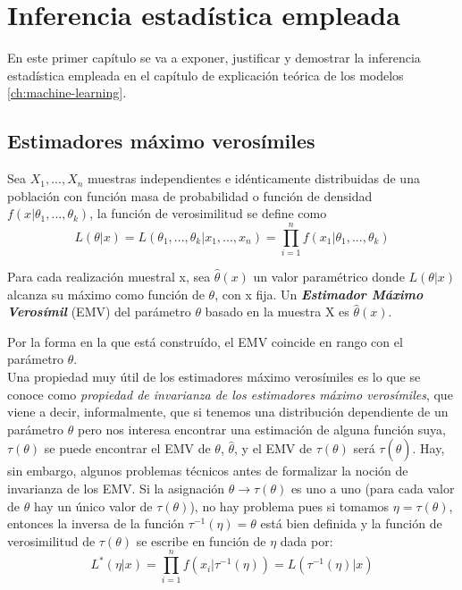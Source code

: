 
\chapter{Inferencia estadística empleada}
En este primer capítulo se va a exponer, justificar y demostrar la inferencia estadística empleada en el capítulo de explicación teórica de los modelos \autoref{ch:machine-learning}.\\
\section{Estimadores máximo verosímiles}\label{st:emv}
Sea $X_{1},...,X_{n}$ muestras independientes e idénticamente distribuidas de una población con función masa de probabilidad o función de densidad $f(x \vert \theta_{1},...,\theta_{k})$, la función de verosimilitud se define como
\[ L(\theta \vert x)=L(\theta_{1},...,\theta_{k} \vert x_{1},...,x_{n})=\prod_{i=1}^{n} f(x_{1} \vert \theta_{1},...,\theta_{k}) \]
\begin{definicion}
Para cada realización muestral x, sea $\hat{\theta}(x)$ un valor paramétrico donde $L(\theta \vert x)$ alcanza su máximo como función de $\theta$, con x fija. Un \textbf{\textit{Estimador Máximo Verosímil}} (EMV) del parámetro $\theta$ basado en la muestra X es $\hat{\theta}(x)$. \cite{garthwaite2002statistical} \end{definicion}
Por la forma en la que está construído, el EMV coincide en rango con el parámetro $\theta$.\\
Una propiedad muy útil de los estimadores máximo verosímiles es lo que se conoce como \textit{propiedad de invarianza de los estimadores máximo verosímiles}, que viene a decir, informalmente, que si tenemos una distribución dependiente de un parámetro $\theta$ pero nos interesa encontrar una estimación de alguna función suya, $\tau(\theta)$ se puede encontrar el EMV de $\theta$, $\hat{\theta}$, y el EMV de $\tau(\theta)$ será $\tau(\hat{\theta})$. Hay, sin embargo, algunos problemas técnicos antes de formalizar la noción de invarianza de los EMV. Si la asignación $\theta \rightarrow \tau(\theta)$ es uno a uno (para cada valor de $\theta$ hay un único valor de $\tau(\theta)$), no hay problema pues si tomamos $\eta = \tau(\theta)$, entonces la inversa de la función $\tau^{-1}(\eta)=\theta$ está bien definida y la función de verosimilitud de $\tau(\theta)$ se escribe en función de $\eta$ dada por: \[ L^{*}(\eta \vert x) = \prod_{i=1}^{n}f(x_{i} \vert \tau^{-1}(\eta)) = L(\tau^{-1}(\eta) \vert x) \]
